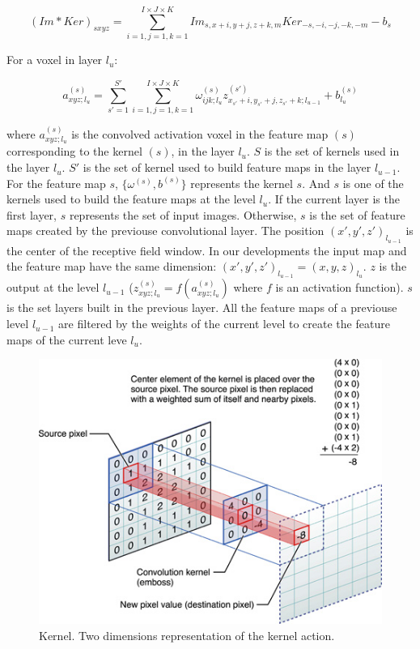 \documentclass[final, paper=letter,5p,times,twocolumn]{elsarticle}
\begin{document}
\begin{equation*}
    (Im*Ker)_{sxyz} = \sum_{i=1,j=1,k=1}^{I \times J \times K} Im_{s,x+i,y+j,z+k,m}Ker_{-s,-i,-j,-k,-m} - b_{s}
  \label{eq:convolution_tot} 
\end{equation*}

For a voxel in layer $l_{u}$:

\begin{equation}
    a_{xyz;l_{u}}^{(s)} =  \sum_{s'=1}^{S'}\sum_{i=1,j=1,k=1}^{I \times J \times K}\omega_{ijk;l_{u}}^{(s)}z_{x_{s'}+i,y_{s'}+j,z_{s'}+k;l_{u-1}}^{(s')} + b_{l_{u}}^{(s)}
  \label{eq:convolution_tot_vox} 
\end{equation}

where $a_{xyz;l_{u}}^{(s)}$ is the convolved activation voxel in the feature map $(s)$ corresponding to the kernel $(s)$, in the layer $l_{u}$. $S$ is the set of kernels used in the layer $l_{u}$. $S'$ is the set of kernel used to build feature maps in the layer $l_{u-1}$. For the feature map $s$, $\{\omega^{(s)}, b^{(s)}\}$ represents the kernel $s$. And $s$ is one of the kernels used to build the feature maps at the level $l_{u}$. If the current layer is the first layer, $s$ represents the set of input images. Otherwise, $s$ is the set of feature maps created by the previouse convolutional layer. The position $(x',y',z')_{l_{u-1}}$ is the center of the receptive field window. In our developments the input map and the feature map have the same dimension: $(x',y',z')_{l_{u-1}} = (x,y,z)_{l_{u}}$. $z$ is the output at the level $l_{u-1}$ ($z_{xyz;l_{u}}^{(s)} = f(a_{xyz;l_{u}}^{(s)})$ where $f$ is an activation function). $s$ is the set layers built in the previous layer. All the feature maps of a previouse level $l_{u-1}$ are filtered by the weights of the current level to create the feature maps of the current leve $l_{u}$.



\begin{figure}[htbp]
   \begin{center}
      \includegraphics[scale=0.3, angle=0]{images/GvsBA.jpg}
   \end{center}
   \caption{Kernel. Two dimensions representation of the kernel action.}
  \label{fig:Kernel} 
\end{figure}
\end{document}
